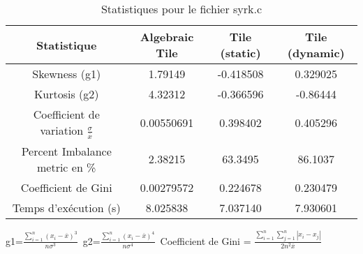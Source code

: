 \documentclass{article}
\begin{document}
\begin{table}[htbp]
  \centering
  \caption{Statistiques pour le fichier syrk.c}
  \begin{tabular}{|c|c|c|c|}
    \hline
    Statistique & Algebraic Tile & Tile (static) & Tile (dynamic) \\ 
    \hline
    Skewness (g1)  & 1.79149 & -0.418508 & 0.329025 \\ 
    Kurtosis (g2)  & 4.32312 & -0.366596 & -0.86444 \\ 
    Coefficient de variation $ \frac{\sigma}{\overline{x}} $ & 0.00550691 & 0.398402 & 0.405296\\ 
    Percent Imbalance metric en \% & 2.38215 & 63.3495 & 86.1037\\ 
    Coefficient de Gini  & 0.00279572 & 0.224678 & 0.230479\\ 
    Temps d'exécution (s) &  8.025838    &  7.037140   &  7.930601   \\ 

    \hline
  \end{tabular}
\end{table}
g1=$ \frac{\sum_{i=1}^{n} (x_i - \overline{x})^3}{n\sigma^3} $\
g2=$ \frac{\sum_{i=1}^{n} (x_i - \overline{x})^4}{n\sigma^4} $\
Coefficient de Gini = $ \frac{\sum_{i=1}^{n}\sum_{j=1}^{n} |x_i - x_j|}{2n^2\overline{x}} $\
\newpage
\end{document}

